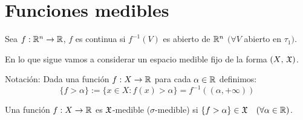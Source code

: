 \section{Funciones medibles}

\begin{prop}
    Sea $f: \mathbb{R}^n \to \mathbb{R}$, $f$ es continua si $f^{-1}(V)$ es abierto de $ \mathbb{R}^n$ $(\forall V$ abierto en $\tau_1)$.
\end{prop}
En lo que sigue vamos a considerar un espacio medible fijo de la forma $(X \text{, } \mathfrak{X})$.

Notación: Dada una función $f: X \to \mathbb{R}$ para cada $\alpha \in \mathbb{R}$ definimos: \begin{equation*}
    \{ f > \alpha \} := \{ x \in X : f(x) > \alpha \} = f^{-1}((\alpha, +\infty))
\end{equation*}

\begin{definition}
    Una función $f: X \to \mathbb{R}$ es $\mathfrak{X}$-medible ($ \sigma $-medible) si $\{ f > \alpha \} \in \mathfrak{X} \quad (\forall \alpha \in \mathbb{R})$.
\end{definition}

